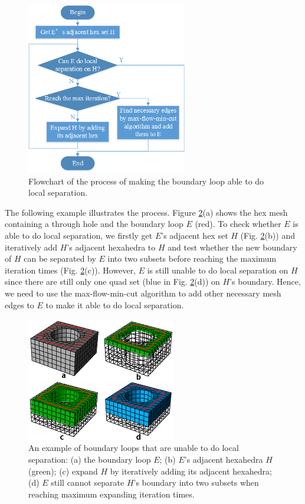\documentclass[final,5p,times,twocolumn]{elsarticle}
\begin{document}
\begin{figure}[htbp]
\begin{center}
\includegraphics[width=7cm]{figures/flow_local_separation.png}
\caption{Flowchart of the process of making the boundary loop able to do local separation.}
\label{fig:flow_local_sep}
\end{center}
\end{figure}

The following example illustrates the process. Figure \ref{fig:local_sep_exam}(a) shows the hex mesh containing a through hole and the boundary loop $E$ (red). To check whether $E$ is able to do local separation, we firstly get $E$'s adjacent hex set $H$ (Fig. \ref{fig:local_sep_exam}(b)) and iteratively add $H$'s adjacent hexahedra to $H$ and test whether the new boundary of $H$ can be separated by $E$ into two subsets before reaching the maximum iteration times (Fig. \ref{fig:local_sep_exam}(c)). However, $E$ is still unable to do local separation on $H$ since there are still only one quad set (blue in Fig. \ref{fig:local_sep_exam}(d)) on $H$'s boundary. Hence, we need to use the max-flow-min-cut algorithm to add other necessary mesh edges to $E$ to make it able to do local separation.

\begin{figure}[htbp]
\begin{center}
\includegraphics[width=6.5cm]{figures/local_sep_exam.png}
\caption{An example of boundary loops that are unable to do local separation: (a) the boundary loop $E$; (b) $E$'s adjacent hexahedra $H$(green); (c) expand $H$ by iteratively adding its adjacent hexahedra; (d) $E$ still cannot separate $H$'s boundary into two subsets when reaching maximum expanding iteration times.}
\label{fig:local_sep_exam}
\end{center}
\end{figure}
\end{document}
